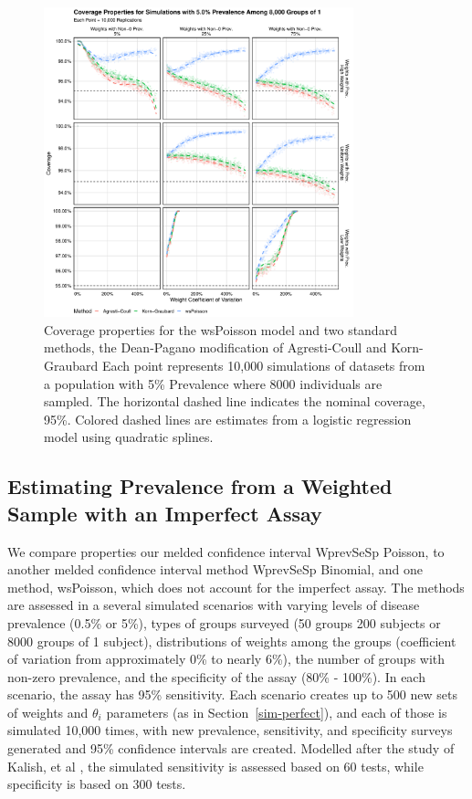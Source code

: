 \documentclass[AMA,STIX1COL]{WileyNJD-v2}
\begin{document}
\begin{figure}
\centering
\includegraphics[width=0.8\textwidth]{figures/perfect_coverage_8000_groups_0_05_prev.pdf}
\caption{Coverage properties for the wsPoisson model and two standard methods, the Dean-Pagano modification of Agresti-Coull and Korn-Graubard
Each point represents 10,000 simulations of datasets from a population with 5\% Prevalence where 8000 individuals are sampled.
The horizontal dashed line indicates the nominal coverage, 95\%.
Colored dashed lines are estimates from a logistic regression model using quadratic splines.}
\label{fig:perfect_coverage_8000_groups_0_05_prev}
\end{figure}


\subsection{Estimating Prevalence from a Weighted Sample with an Imperfect Assay}


We compare properties our melded confidence interval WprevSeSp Poisson, to another melded confidence interval method WprevSeSp Binomial, and one method, wsPoisson, which does not account for the imperfect assay.
The methods are assessed in a several simulated scenarios with varying levels of disease prevalence (0.5\% or 5\%), types of groups surveyed (50 groups 200 subjects or 8000 groups of 1 subject), distributions of weights among the groups (coefficient of variation from approximately 0\% to nearly 6\%), the number of groups with non-zero prevalence, and the specificity of the assay (80\% - 100\%).
In each scenario, the assay has 95\% sensitivity.
Each scenario creates up to 500 new sets of weights and $\theta_i$ parameters (as in Section~\ref{sim-perfect}), and each of those is simulated 10,000 times, with new prevalence, sensitivity, and specificity surveys generated and 95\% confidence intervals are created.
Modelled after the study of Kalish, et al \cite{Kali:2021}, the simulated sensitivity is assessed based on 60 tests, while specificity is based on 300 tests.
\end{document}
